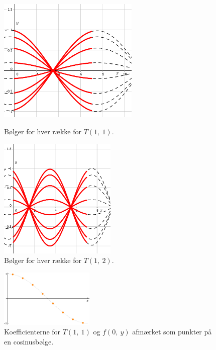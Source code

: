 \begin{figure}[!h]
\begin{minipage}[b]{0.5\linewidth}
\centering
\includegraphics[width=0.6\textwidth]{Billeder/Frekvens-eksempelu1v1.png}
\caption{Bølger for hver række for $T(1,\ 1)$.} %
\label{fig:frekeksu1v1}
\end{minipage}
\begin{minipage}[b]{0.5\linewidth}
\centering
\includegraphics[width=0.5\textwidth]{Billeder/Frekvens-eksempelu1v2.png}
\caption{Bølger for hver række for $T(1,\ 2)$.}
\label{fig:frekeksu1v2}
\end{minipage}
\end{figure}

\begin{figure}[htbp]
\centering
\includegraphics[width=0.4\textwidth]{Billeder/coskoefficienter.png}
\caption{Koefficienterne for $T(1,\ 1)$ og $f(0,\ y)$ afmærket som punkter på en cosinusbølge.}
\label{fig:cosko}
\end{figure}

